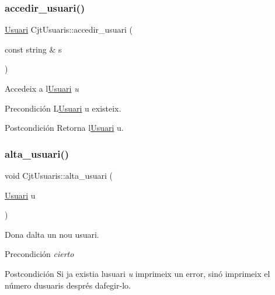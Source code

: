 \subsubsection{\texorpdfstring{accedir\+\_\+usuari()}{accedir\_usuari()}}
{\footnotesize\ttfamily \mbox{\hyperlink{class_usuari}{Usuari}} Cjt\+Usuaris\+::accedir\+\_\+usuari (\begin{DoxyParamCaption}\item[{const string \&}]{s }\end{DoxyParamCaption})}



Accedeix a l\textquotesingle{}\mbox{\hyperlink{class_usuari}{Usuari}} {\itshape u} 

\begin{DoxyPrecond}{Precondición}
L\textquotesingle{}\mbox{\hyperlink{class_usuari}{Usuari}} u existeix. 
\end{DoxyPrecond}
\begin{DoxyPostcond}{Postcondición}
Retorna l\textquotesingle{}\mbox{\hyperlink{class_usuari}{Usuari}} u. 
\end{DoxyPostcond}
\mbox{\label{class_cjt_usuaris_a40b8eb64e9dc22e3cf0ee38d52d48e20}} 
\subsubsection{\texorpdfstring{alta\+\_\+usuari()}{alta\_usuari()}}
{\footnotesize\ttfamily void Cjt\+Usuaris\+::alta\+\_\+usuari (\begin{DoxyParamCaption}\item[{\mbox{\hyperlink{class_usuari}{Usuari}}}]{u }\end{DoxyParamCaption})}



Dona d\textquotesingle{}alta un nou usuari. 

\begin{DoxyPrecond}{Precondición}
{\itshape cierto} 
\end{DoxyPrecond}
\begin{DoxyPostcond}{Postcondición}
Si ja existia l\textquotesingle{}usuari {\itshape u} imprimeix un error, sinó imprimeix el número d\textquotesingle{}usuaris després d\textquotesingle{}afegir-\/lo. 
\end{DoxyPostcond}
\mbox{\label{class_cjt_usuaris_a8aa977e92fd28d1c1dd1604ec3ed21e8}} 

